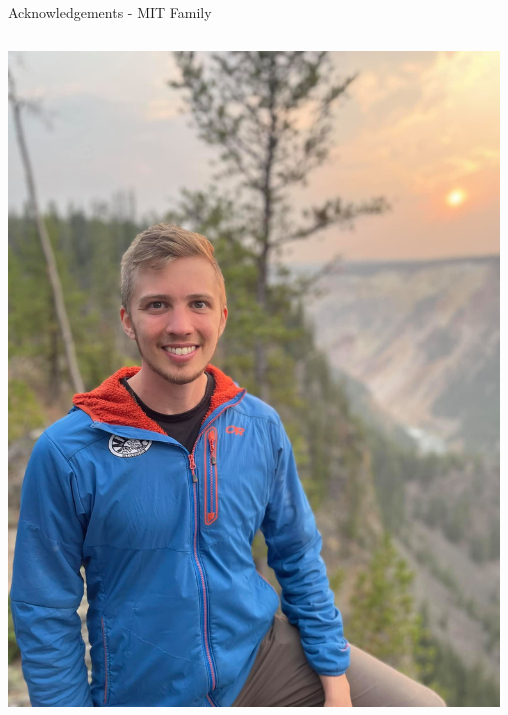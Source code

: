 \documentclass[aspectratio=169]{beamer}
\begin{document}
\begin{frame}{Acknowledgements - MIT Family }
\begin{columns}
                \includegraphics[width=0.9765\textwidth]{people/band/stan.png}
                \centering

\end{columns}
\end{frame}
\end{document}
